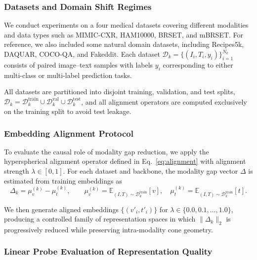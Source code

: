 \documentclass[runningheads]{llncs}
\begin{document}

\subsubsection{Datasets and Domain Shift Regimes}
\label{sec:datasets}

We conduct experiments on a four medical datasets covering different modalities and data types such as MIMIC-CXR, HAM10000, BRSET, and mBRSET. For reference, we also included some natural domain datasets, including Recipes5k, DAQUAR, COCO-QA, and Fakeddit. Each dataset $\mathcal{D}_k=\{(I_i,T_i,y_i)\}_{i=1}^{N_k}$ consists of paired image--text samples with labels $y_i$ corresponding to either multi-class or multi-label prediction tasks. 

All datasets are partitioned into disjoint training, validation, and test splits,
$\mathcal{D}_k=\mathcal{D}_k^{\text{train}}\cup\mathcal{D}_k^{\text{val}}\cup\mathcal{D}_k^{\text{test}}$,
and all alignment operators are computed exclusively on the training split to avoid test leakage.

\subsubsection{Embedding Alignment Protocol}
\label{sec:lambda_protocol}

To evaluate the causal role of modality gap reduction, we apply the hyperspherical alignment operator defined in Eq.~\ref{eq:alignment} with alignment strength $\lambda\in[0,1]$. For each dataset and backbone, the modality gap vector $\Delta$ is estimated from training embeddings as
\begin{equation}
\Delta_k = \mu_v^{(k)} - \mu_t^{(k)},
\qquad
\mu_v^{(k)}=\mathbb{E}_{(I,T)\sim \mathcal{D}_k^{\text{train}}}[v],
\quad
\mu_t^{(k)}=\mathbb{E}_{(I,T)\sim \mathcal{D}_k^{\text{train}}}[t].
\end{equation}

We then generate aligned embeddings $\{(v'_i,t'_i)\}$ for $\lambda\in\{0.0,0.1,\dots,1.0\}$, producing a controlled family of representation spaces in which $\|\Delta_k\|_2$ is progressively reduced while preserving intra-modality cone geometry.


\subsubsection{Linear Probe Evaluation of Representation Quality}
\label{sec:linear_probe_eval}
\end{document}
